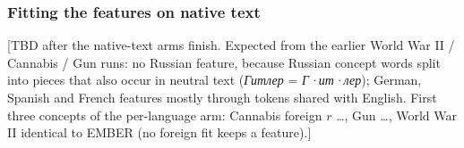 \subsubsection{Fitting the features on native text}

[TBD after the native-text arms finish. Expected from the earlier World War II / Cannabis / Gun runs: no Russian feature, because Russian concept words split into pieces that also occur in neutral text (\emph{Гитлер} = \emph{Г·ит·лер}); German, Spanish and French features mostly through tokens shared with English. First three concepts of the per-language arm: Cannabis foreign $r$ \ldots, Gun \ldots, World War II identical to EMBER (no foreign fit keeps a feature).]

